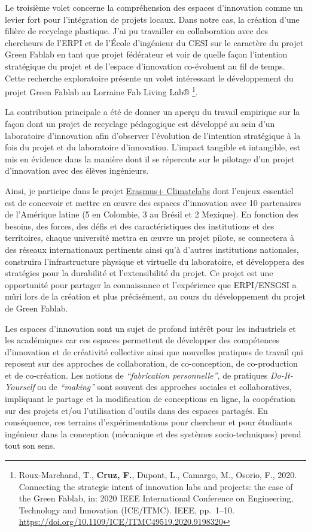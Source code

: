 \documentclass[
  12pt,
  oneside]{book}
\begin{document}
Le troisième volet concerne la compréhension des espaces d'innovation comme un levier fort pour l'intégration de projets locaux. Dans notre cas, la création d'une filière de recyclage plastique.
J'ai pu travailler en collaboration avec des chercheurs de l'ERPI et de l'École d'ingénieur du CESI sur le caractère du projet Green Fablab en tant que projet fédérateur et voir de quelle façon l'intention stratégique du projet et de l'espace d'innovation co-évoluent au fil de temps. Cette recherche exploratoire présente un volet intéressant le développement du projet Green Fablab au Lorraine Fab Living Lab® \footnote{Roux-Marchand, T., \textbf{Cruz, F.}, Dupont, L., Camargo, M., Osorio, F., 2020. Connecting the strategic intent of innovation labs and projects: the case of the Green Fablab, in: 2020 IEEE International Conference on Engineering, Technology and Innovation (ICE/ITMC). IEEE, pp.~1--10. \url{https://doi.org/10.1109/ICE/ITMC49519.2020.9198320}}.

La contribution principale a été de donner un aperçu du travail empirique sur la façon dont un projet de recyclage pédagogique est développé au sein d'un laboratoire d'innovation afin d'observer l'évolution de l'intention stratégique à la fois du projet et du laboratoire d'innovation. L'impact tangible et intangible, est mis en évidence dans la manière dont il se répercute sur le pilotage d'un projet d'innovation avec des élèves ingénieurs.

Ainsi, je participe dans le projet \href{https://erpi.univ-lorraine.fr/fr/projects/Climatelabs/}{Erasmus+ Climatelabs} dont l'enjeux essentiel est de concevoir et mettre en œuvre des espaces d'innovation avec 10 partenaires de l'Amérique latine (5 en Colombie, 3 au Brésil et 2 Mexique). En fonction des besoins, des forces, des défis et des caractéristiques des institutions et des territoires, chaque université mettra en œuvre un projet pilote, se connectera à des réseaux internationaux pertinents ainsi qu'à d'autres institutions nationales, construira l'infrastructure physique et virtuelle du laboratoire, et développera des stratégies pour la durabilité et l'extensibilité du projet. Ce projet est une opportunité pour partager la connaissance et l'expérience que ERPI/ENSGSI a mûri lors de la création et plus précisément, au cours du développement du projet de Green Fablab.

Les espaces d'innovation sont un sujet de profond intérêt pour les industriels et les académiques car ces espaces permettent de développer des compétences d'innovation et de créativité collective ainsi que nouvelles pratiques de travail qui reposent sur des approches de collaboration, de co-conception, de co-production et de co-création.
Les notions de \emph{``fabrication personnelle''}, de pratiques \emph{Do-It-Yourself} ou de \emph{``making''} sont souvent des approches sociales et collaboratives, impliquant le partage et la modification de conceptions en ligne, la coopération sur des projets et/ou l'utilisation d'outils dans des espaces partagés.
En conséquence, ces terrains d'expérimentations pour chercheur et pour étudiants ingénieur dans la conception (mécanique et des systèmes socio-techniques) prend tout son sens.
\end{document}
